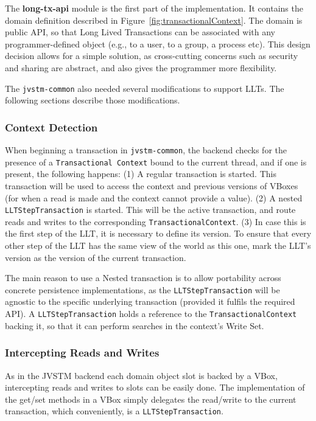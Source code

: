 \documentclass{llncs}
\begin{document}
The {\bf long-tx-api} module is the first part of the implementation. It contains
the domain definition described in
Figure~\ref{fig:transactionalContext}. The domain is public API, so
that Long Lived Transactions can be associated with any
programmer-defined object (e.g., to a user, to a group, a process
etc). This design decision allows for a simple solution, as
cross-cutting concerns such as security and sharing are abstract, and
also gives the programmer more flexibility.

The \texttt{jvstm-common} also needed several modifications to support
LLTs. The following sections describe those modifications.

\subsubsection{Context Detection}

When beginning a transaction in \texttt{jvstm-common}, the backend
checks for the presence of a \texttt{Transactional Context} bound to
the current thread, and if one is present, the following happens: (1)
A regular transaction is started. This transaction will be used to
access the context and previous versions of VBoxes (for when a read is
made and the context cannot provide a value). (2) A nested
\texttt{LLTStepTransaction} is started. This will be the active
transaction, and route reads and writes to the corresponding
\texttt{TransactionalContext}. (3) In case this is the first step of
the LLT, it is necessary to define its version. To ensure that every
other step of the LLT has the same view of the world as this one, mark
the LLT's version as the version of the current transaction.

The main reason to use a Nested transaction is to allow portability
across concrete persistence implementations, as the
\texttt{LLTStepTransaction} will be agnostic to the specific
underlying transaction (provided it fulfils the required API). A
\texttt{LLTStepTransaction} holds a reference to the
\texttt{TransactionalContext} backing it, so that it can perform
searches in the context's Write Set.

\subsubsection{Intercepting Reads and Writes}

As in the JVSTM backend each domain object slot is backed by a VBox,
intercepting reads and writes to slots can be easily done. The
implementation of the get/set methods in a VBox simply delegates the
read/write to the current transaction, which conveniently, is a
\texttt{LLTStepTransaction}.
\end{document}
